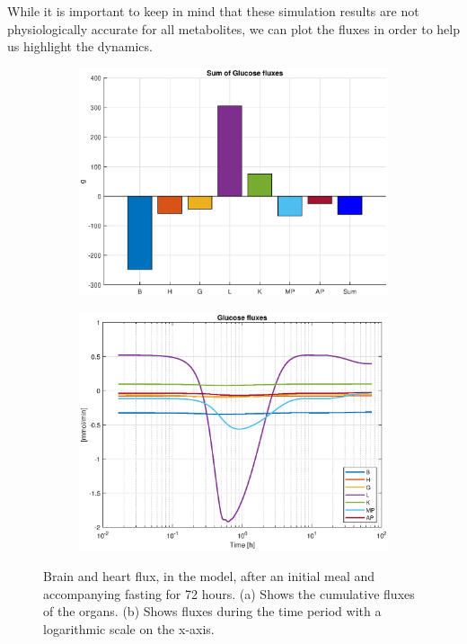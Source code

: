 \documentclass{IEEEtran}
\begin{document}
While it is important to keep in mind that these simulation results are not physiologically accurate for all metabolites, we can plot the fluxes in order to help us highlight the dynamics.



\begin{figure}[H]
     \centering
     \begin{subfigure}{1\columnwidth}
         \centering
         \caption{}
         \includegraphics[width=\columnwidth]{Diagrams/Fasting/Flux/bar_plot_flux.eps}
         \label{fig:barplot_glucose}
     \end{subfigure}
     \hfill
     \begin{subfigure}{1\columnwidth}
         \centering
         \caption{}
         \includegraphics[width=\columnwidth]{Diagrams/Fasting/Flux/glucose_flux.eps}
         \label{fig:glucose_flux_plot}
     \end{subfigure}
     \caption[short]{Brain and heart flux, in the model, after an initial meal and accompanying fasting for 72 hours. (a) Shows the cumulative fluxes of the organs. (b) Shows fluxes during the time period with a logarithmic scale on the x-axis.}
    \label{fig:glucose_flux}
\end{figure}
\end{document}
